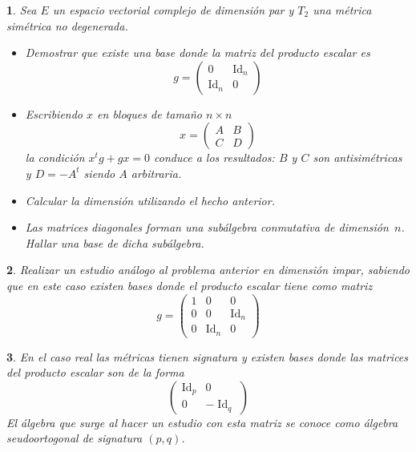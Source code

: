 \documentclass[a4paper,draft,12pt]{article}
\newtheorem{pro1}{}%
\newenvironment{pro}{\begin{pro1} \rm} {\end{pro1}}
\newcommand{\df}[1]{\textsf{\color{blue}#1}}
\DeclareMathOperator{\Id}{Id}%
\begin{document}
\begin{pro}

Sea $E$ un espacio vectorial complejo de dimensión par y $T_2$ una métrica simétrica no degenerada.

\begin{itemize}

\item Demostrar que existe una base donde la matriz del producto escalar es
$$
g=  \begin{pmatrix}
0 & \Id_n \\
\Id_n& 0
\end{pmatrix}
$$

\item Escribiendo $x$ en bloques de tamaño $n  \times n$
$$
x= \begin{pmatrix} A & B \\ C & D \end{pmatrix}
$$
la condición $x^tg+gx=0$ conduce a los resultados: $B$ y $C$ son antisimétricas y $D=-A^t$ siendo $A$ arbitraria.

\item Calcular la dimensión utilizando el hecho anterior.

\item Las matrices diagonales forman una subálgebra conmutativa de dimensión~$n$.  Hallar una base de dicha subálgebra.

\end{itemize}

\end{pro}

\begin{pro}

Realizar un estudio análogo al problema anterior en dimensión impar, sabiendo que en este caso existen bases donde el producto escalar tiene como matriz
$$
g= \begin{pmatrix}
1 & 0 & 0 \\
0 & 0 & \Id_n \\
0 & \Id_n & 0
\end{pmatrix}
$$

\end{pro}

\begin{pro}

En el caso real las métricas tienen signatura y existen bases donde las matrices del producto escalar son de la forma
$$
\begin{pmatrix} 
\Id_p & 0 \\
0 &- \Id_q
\end{pmatrix}
$$
El álgebra que surge al hacer un estudio con esta matriz se conoce como  \df{álgebra seudoortogonal}  de signatura $(p,q)$.

\end{pro}
\end{document}

